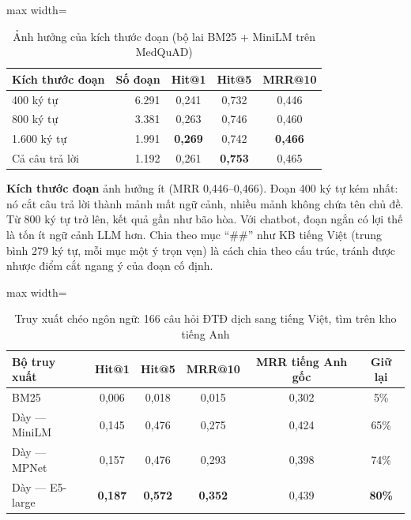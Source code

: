 \begin{table}[H]
\centering
\caption{Ảnh hưởng của kích thước đoạn (bộ lai BM25 + MiniLM trên MedQuAD)}
\label{tab:ch5-chunk}
\small
\begin{adjustbox}{max width=\linewidth}
\begin{tabular}{@{}lrccc@{}}
\toprule
\textbf{Kích thước đoạn} & \textbf{Số đoạn} & \textbf{Hit@1} & \textbf{Hit@5} & \textbf{MRR@10} \\
\midrule
400 ký tự & 6.291 & 0,241 & 0,732 & 0,446 \\
800 ký tự & 3.381 & 0,263 & 0,746 & 0,460 \\
1.600 ký tự & 1.991 & \textbf{0,269} & 0,742 & \textbf{0,466} \\
Cả câu trả lời & 1.192 & 0,261 & \textbf{0,753} & 0,465 \\
\bottomrule
\end{tabular}
\end{adjustbox}
\end{table}

\textbf{Kích thước đoạn} ảnh hưởng ít (MRR 0,446–0,466). Đoạn 400 ký tự kém nhất: nó cắt câu trả lời thành mảnh mất ngữ cảnh, nhiều mảnh không chứa tên chủ đề. Từ 800 ký tự trở lên, kết quả gần như bão hòa. Với chatbot, đoạn ngắn có lợi thế là tốn ít ngữ cảnh LLM hơn. Chia theo mục ``\#\#'' như KB tiếng Việt (trung bình 279 ký tự, mỗi mục một ý trọn vẹn) là cách chia theo cấu trúc, tránh được nhược điểm cắt ngang ý của đoạn cố định.

\begin{table}[H]
\centering
\caption{Truy xuất chéo ngôn ngữ: 166 câu hỏi ĐTĐ dịch sang tiếng Việt, tìm trên kho tiếng Anh}
\label{tab:ch5-cross}
\small
\begin{adjustbox}{max width=\linewidth}
\begin{tabular}{@{}lccccc@{}}
\toprule
\textbf{Bộ truy xuất} & \textbf{Hit@1} & \textbf{Hit@5} & \textbf{MRR@10} & \textbf{MRR tiếng Anh gốc} & \textbf{Giữ lại} \\
\midrule
BM25 & 0,006 & 0,018 & 0,015 & 0,302 & 5\% \\
Dày — MiniLM & 0,145 & 0,476 & 0,275 & 0,424 & 65\% \\
Dày — MPNet & 0,157 & 0,476 & 0,293 & 0,398 & 74\% \\
Dày — E5-large & \textbf{0,187} & \textbf{0,572} & \textbf{0,352} & 0,439 & \textbf{80\%} \\
\bottomrule
\end{tabular}
\end{adjustbox}
\end{table}

